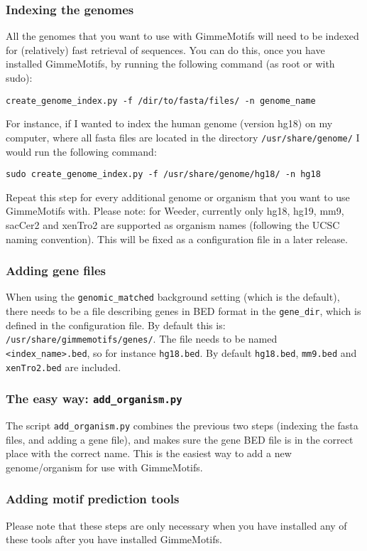 \documentclass[11pt]{article}
\begin{document}
\subsubsection{Indexing the genomes}
\label{sec:indexing}
All the genomes that you want to use with GimmeMotifs will need to be indexed for (relatively) fast retrieval of sequences. You can do this, once you have installed GimmeMotifs, by running the following command (as root or with sudo):
\begin{verbatim}
create_genome_index.py -f /dir/to/fasta/files/ -n genome_name
\end{verbatim}
For instance, if I wanted to index the human genome (version hg18) on my computer, where all fasta files are located in the directory \texttt{/usr/share/genome/} I would run the following command:
\begin{verbatim}
sudo create_genome_index.py -f /usr/share/genome/hg18/ -n hg18
\end{verbatim}
Repeat this step for every additional genome or organism that you want to use GimmeMotifs with. Please note: for Weeder, currently only hg18, hg19, mm9, sacCer2 and xenTro2 are supported as organism names (following the UCSC naming convention). This will be fixed as a configuration file in a later release.

\subsubsection{Adding gene files}
When using the \texttt{genomic\_matched} background setting (which is the default), there needs to be a file describing genes in BED format in the \texttt{gene\_dir}, which is defined in the configuration file. By default this is: \texttt{/usr/share/gimmemotifs/genes/}. The file needs to be named \texttt{<index\_name>.bed}, so for instance \texttt{hg18.bed}. By default \texttt{hg18.bed}, \texttt{mm9.bed} and \texttt{xenTro2.bed} are included.

\subsubsection{The easy way: \texttt{add\_organism.py}}
The script \texttt{add\_organism.py} combines the previous two steps (indexing the fasta files, and adding a gene file), and makes sure the gene BED file is in the correct place with the correct name. This is the easiest way to add a new genome/organism for use with GimmeMotifs.

\subsubsection{Adding motif prediction tools} \label{sec:adding_tools}
Please note that these steps are only necessary when you have installed any of these tools after you have installed GimmeMotifs.
\end{document}
